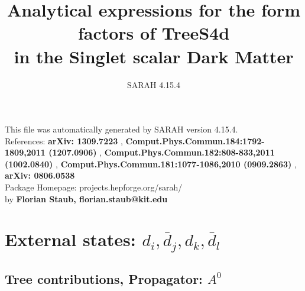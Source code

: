 \documentclass[A4,landscape]{article}
\begin{document}
\title{Analytical expressions for the form factors of TreeS4d\\ in the Singlet scalar Dark Matter } 
 \author{SARAH 4.15.4} 
 \maketitle 
 \vspace{10cm} 
This file was automatically generated by SARAH version 4.15.4.  \\ 
References: {\bf arXiv: 1309.7223 }, {\bf Comput.Phys.Commun.184:1792-1809,2011 (1207.0906) }, {\bf Comput.Phys.Commun.182:808-833,2011 (1002.0840) }, {\bf Comput.Phys.Commun.181:1077-1086,2010 (0909.2863) }, {\bf arXiv: 0806.0538 } \\ 
Package Homepage: projects.hepforge.org/sarah/ \\ 
by {\bf Florian Staub, florian.staub@kit.edu} 
 \pagebreak 
 \tableofcontents 
 \pagebreak 
\section{External states: ${d_{{i}}, \bar{d}_{{j}}, d_{{k}}, \bar{d}_{{l}}}$} 
\subsection{Tree contributions, Propagator: $A^0$} 
\end{document}
